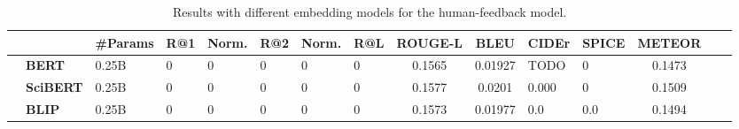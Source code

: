 \begin{table}%
\centering
\renewcommand{\arraystretch}{1.1} 
\small
\begin{tabularx}{\linewidth}{l l H HH HH Hc cH Hccc}
\toprule
&
& 
\textbf{\#Params} & 
R@1 & \sc Norm. & %
R@2 & \sc Norm. & %
R@L & 
\textbf{ROUGE-L} &
\textbf{BLEU} & 
\textbf{CIDEr} & 
\textbf{SPICE} &
\textbf{METEOR} &
\\ \midrule

& \textbf{BERT} & 0.25B & 0 & 0 & 0 & 0 & 0 & 0.1565 & 0.01927 & TODO &  0 & 0.1473 \\ 
& \textbf{SciBERT} & 0.25B & 0 & 0 & 0 & 0 & 0 &   0.1577 &  0.0201 & 0.000  & 0 & 0.1509 \\ 
& \textbf{BLIP} & 0.25B & 0 & 0 & 0 & 0 & 0 &  0.1573 &  0.01977 & 0.0  & 0.0 & 0.1494 \\

\bottomrule
\end{tabularx}
\caption{%
Results with different embedding models for the human-feedback model.
}
\label{table:results-comparison-diff-embedding-models}
\vspace{-4mm}
\end{table}






